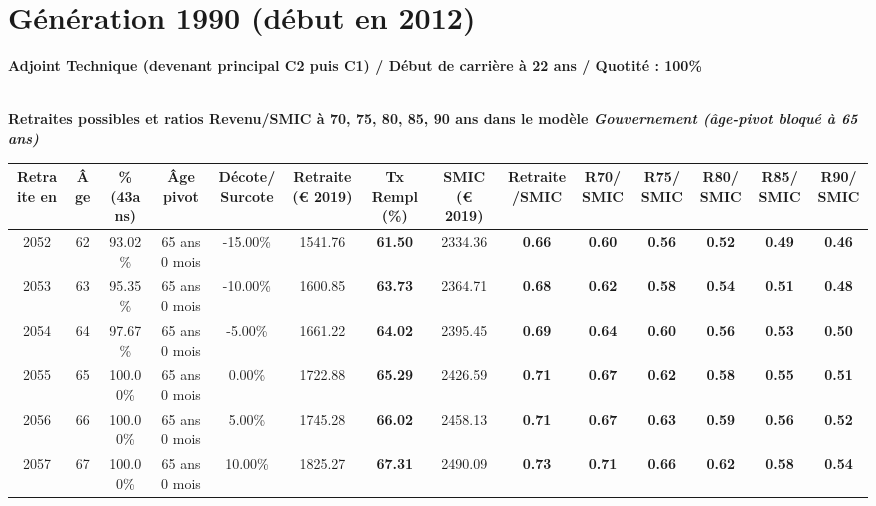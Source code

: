 \newpage 
 
\section{Génération 1990 (début en 2012)\label{AdjTech_100_1990_22_0}} 
 
{\bf \noindent Adjoint Technique (devenant principal C2 puis C1) / Début de carrière à 22 ans / Quotité : 100\%}  ~ 

 ~\\{\bf \noindent Retraites possibles et ratios Revenu/SMIC à 70, 75, 80, 85, 90 ans dans le modèle \emph{Gouvernement (âge-pivot bloqué à 65 ans)}}  
 
\begin{adjustbox}{max width=\textwidth} 
\begin{tabular}[htb]{|c|c||c|c|c||c|c||c|c||c|c|c|c|c|} 
\hline 
 Retraite en &  Âge &  \%(43ans) &  Âge pivot &  Décote/Surcote &  Retraite (\euro{} 2019) &  Tx Rempl(\%) &  SMIC (\euro{} 2019) &  Retraite/SMIC &  R70/SMIC &  R75/SMIC &  R80/SMIC &  R85/SMIC &  R90/SMIC \\ 
\hline \hline 
 2052 &  62 &  93.02\% &  65 ans 0 mois &  -15.00\% &  1541.76 &  {\bf 61.50} &  2334.36 &  {\bf {\color{red} 0.66}} &  {\bf {\color{red} 0.60}} &  {\bf {\color{red} 0.56}} &  {\bf {\color{red} 0.52}} &  {\bf {\color{red} 0.49}} &  {\bf {\color{red} 0.46}} \\ 
\hline 
 2053 &  63 &  95.35\% &  65 ans 0 mois &  -10.00\% &  1600.85 &  {\bf 63.73} &  2364.71 &  {\bf {\color{red} 0.68}} &  {\bf {\color{red} 0.62}} &  {\bf {\color{red} 0.58}} &  {\bf {\color{red} 0.54}} &  {\bf {\color{red} 0.51}} &  {\bf {\color{red} 0.48}} \\ 
\hline 
 2054 &  64 &  97.67\% &  65 ans 0 mois &  -5.00\% &  1661.22 &  {\bf 64.02} &  2395.45 &  {\bf {\color{red} 0.69}} &  {\bf {\color{red} 0.64}} &  {\bf {\color{red} 0.60}} &  {\bf {\color{red} 0.56}} &  {\bf {\color{red} 0.53}} &  {\bf {\color{red} 0.50}} \\ 
\hline 
 2055 &  65 &  100.00\% &  65 ans 0 mois &  0.00\% &  1722.88 &  {\bf 65.29} &  2426.59 &  {\bf {\color{red} 0.71}} &  {\bf {\color{red} 0.67}} &  {\bf {\color{red} 0.62}} &  {\bf {\color{red} 0.58}} &  {\bf {\color{red} 0.55}} &  {\bf {\color{red} 0.51}} \\ 
\hline 
 2056 &  66 &  100.00\% &  65 ans 0 mois &  5.00\% &  1745.28 &  {\bf 66.02} &  2458.13 &  {\bf {\color{red} 0.71}} &  {\bf {\color{red} 0.67}} &  {\bf {\color{red} 0.63}} &  {\bf {\color{red} 0.59}} &  {\bf {\color{red} 0.56}} &  {\bf {\color{red} 0.52}} \\ 
\hline 
 2057 &  67 &  100.00\% &  65 ans 0 mois &  10.00\% &  1825.27 &  {\bf 67.31} &  2490.09 &  {\bf {\color{red} 0.73}} &  {\bf {\color{red} 0.71}} &  {\bf {\color{red} 0.66}} &  {\bf {\color{red} 0.62}} &  {\bf {\color{red} 0.58}} &  {\bf {\color{red} 0.54}} \\ 
\hline 
\hline 
\end{tabular} 
\end{adjustbox} 
 
